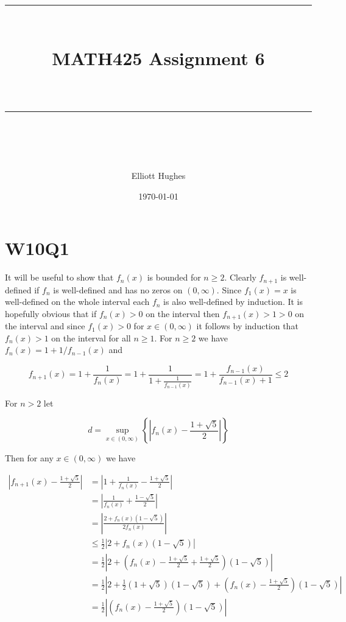 \documentclass{article}
\title{	
	\normalfont\normalsize 
	\rule{\linewidth}{0.5pt}\\ %
	\vspace{14pt} %
	{\LARGE MATH425 Assignment 6\\ %
    \large \textit{} \\}
	\vspace{6pt} %
	\rule{\linewidth}{1pt}\\ %
}
\author{Elliott Hughes}
\date{\normalsize\today}
\begin{document}
\maketitle

\section*{W10Q1}
It will be useful to show that $f_n(x)$ is bounded for $n \geq 2$. Clearly $f_{n+1}$ is well-defined if 
$f_n$ is well-defined and has no zeros on $(0,\infty)$. Since $f_1(x) = x$ 
is well-defined on the whole interval each $f_n$ is also well-defined by induction. It is 
hopefully obvious that if $f_n(x) > 0$ on the interval then $f_{n+1}(x) > 1 > 0$ on the interval 
and since $f_1(x) > 0$ for $x \in (0,\infty)$ it follows by induction that $f_n(x) > 1$ on 
the interval for all $n \geq 1$. For $n \geq 2$ we have $f_n(x) = 1 + 1/f_{n-1}(x)$ and 

\begin{equation*}
    f_{n+1}(x) = 1 + \frac{1}{f_n(x)} = 1 + \frac{1}{1 + \frac{1}{f_{n-1}(x)}} = 1 + \frac{f_{n-1}(x)}{f_{n-1}(x) + 1} \leq 2
\end{equation*}

For $n > 2$ let 

\begin{equation*}
    d = \sup_{x \in (0,\infty)}\left\{\left|f_n(x) - \frac{1+\sqrt{5}}{2} \right|\right\}
\end{equation*}

Then for any $x \in (0,\infty)$ we have 

\begin{align*}
    \left|f_{n+1}(x) - \frac{1+\sqrt{5}}{2}\right| &= \left| 1 + \frac{1}{f_n(x)} - \frac{1+\sqrt{5}}{2} \right| \\
    &= \left| \frac{1}{f_n(x)} + \frac{1-\sqrt{5}}{2} \right| \\
    &= \left|\frac{2 + f_n(x)(1-\sqrt{5})}{2f_n(x)}\right| \\
    &\leq \frac{1}{2}|2 + f_n(x)(1-\sqrt{5})| \\
    &= \frac{1}{2}\left|2 + \left(f_n(x) - \frac{1 + \sqrt{5}}{2}+ \frac{1 + \sqrt{5}}{2}\right)(1-\sqrt{5}) \right|\\
    &= \frac{1}{2}\left|2  + \frac{1}{2}(1+\sqrt{5})(1-\sqrt{5}) + \left(f_n(x) - \frac{1 + \sqrt{5}}{2}\right)(1-\sqrt{5})\right|\\
    &=\frac{1}{2}\left|\left(f_n(x) - \frac{1 + \sqrt{5}}{2}\right)(1-\sqrt{5}) \right|
\end{align*}
\end{document}
